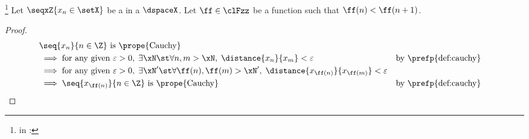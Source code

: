 \begin{proposition}
\footnote{
  in :
  }
\label{prop:cauchy_subseq}
Let $\seqxZ{x_n\in\setX}$ be a  in a  $\dspaceX$. %
Let $\ff\in\clFzz$ be a  function such that $\ff(n)<\ff(n+1)$.
\end{proposition}
\begin{proof}
\begin{align*}
  &\text{$\seq{x_n}{n\in\Z}$ is \prope{Cauchy}}
  \\&\implies \text{for any given } \varepsilon>0,\; \exists\xN \st \forall n,m>\xN,\; \distance{x_n}{x_m}<\varepsilon
    &&        \text{by \prefp{def:cauchy}}
  \\&\implies \text{for any given } \varepsilon>0,\; \exists\xN' \st \forall \ff(n),\ff(m)>\xN',\; \distance{x_{\ff(n)}}{x_{\ff(m)}}<\varepsilon
  \\&\implies \seq{x_{\ff(n)}}{n\in\Z} \text{ is \prope{Cauchy}}
    &&        \text{by \prefp{def:cauchy}}
\end{align*}
\end{proof}




